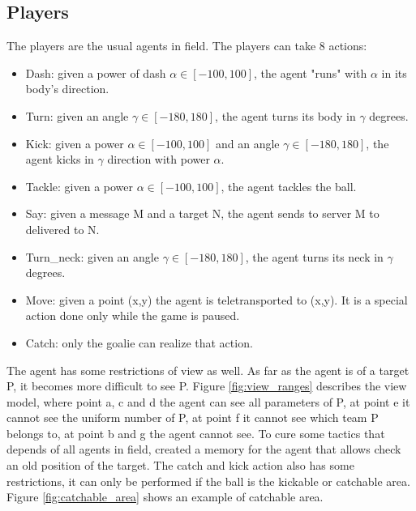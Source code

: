 \subsection{Players}\label{section:players}
The players are the usual agents in field. The players can take 8 actions:

\begin{itemize}
    \item Dash: given a power of dash $\alpha \in [-100, 100]$, the agent "runs" with $\alpha$ in its body's direction.
    \item Turn: given an angle $\gamma \in [-180, 180]$, the agent turns its body in $\gamma$ degrees.
    \item Kick: given a power $\alpha \in [-100, 100]$ and an angle $\gamma \in [-180, 180]$, the agent kicks in $\gamma$ direction with power $\alpha$.
    \item Tackle: given a power $\alpha \in [-100, 100]$, the agent tackles the ball.
    \item Say: given a message M and a target N, the agent sends to server M to delivered to N.
    \item Turn\_neck: given an angle $\gamma \in [-180, 180]$, the agent turns its neck in $\gamma$ degrees.
    \item Move: given a point (x,y) the agent is teletransported to (x,y). It is a special action done only while the game is paused.
    \item Catch: only the goalie can realize that action.
\end{itemize}
The agent has some restrictions of view as well. As far as the agent is of a target P, it becomes more difficult to see P. Figure \ref{fig:view_ranges} describes the view model, where point a, c and d the agent can see all parameters of P, at point e it cannot see the uniform number of P, at point f it cannot see which team P belongs to, at point b and g the agent cannot see. To cure some tactics that depends of all agents in field, \cite{heliosbase} created a memory for the agent that allows check an old position of the target. The catch and kick action also has some restrictions, it can only be performed if the ball is the kickable or catchable area. Figure \ref{fig:catchable_area} shows an example of catchable area.
